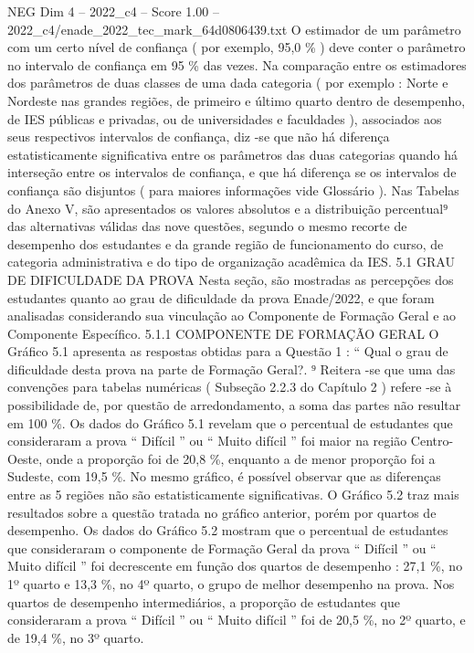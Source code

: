 \begin{textsample}{NEG Dim 4 – 2022\_c4 – Score 1.00 – 2022\_c4/enade\_2022\_tec\_mark\_64d0806439.txt}
O estimador de um parâmetro com um certo nível de confiança ( por exemplo, 95,0 \% ) deve conter o parâmetro no intervalo de confiança em 95 \% das vezes.
Na comparação entre os estimadores dos parâmetros de duas classes de uma dada categoria ( por exemplo : Norte e Nordeste nas grandes regiões, de primeiro e último quarto dentro de desempenho, de IES públicas e privadas, ou de universidades e faculdades ), associados aos seus respectivos intervalos de confiança, diz -se que não há diferença estatisticamente significativa entre os parâmetros das duas categorias quando há interseção entre os intervalos de confiança, e que há diferença se os intervalos de confiança são disjuntos ( para maiores informações vide Glossário ).
Nas Tabelas do Anexo V, são apresentados os valores absolutos e a distribuição percentual⁹ das alternativas válidas das nove questões, segundo o mesmo recorte de desempenho dos estudantes e da grande região de funcionamento do curso, de categoria administrativa e do tipo de organização acadêmica da IES. 5.1 GRAU DE DIFICULDADE DA PROVA Nesta seção, são mostradas as percepções dos estudantes quanto ao grau de dificuldade da prova Enade/2022, e que foram analisadas considerando sua vinculação ao Componente de Formação Geral e ao Componente Específico. 5.1.1 COMPONENTE DE FORMAÇÃO GERAL O Gráfico 5.1 apresenta as respostas obtidas para a Questão 1 : “ Qual o grau de dificuldade desta prova na parte de Formação Geral?. ⁹ Reitera -se que uma das convenções para tabelas numéricas ( Subseção 2.2.3 do Capítulo 2 ) refere -se à possibilidade de, por questão de arredondamento, a soma das partes não resultar em 100 \%.
Os dados do Gráfico 5.1 revelam que o percentual de estudantes que consideraram a prova “ Difícil ” ou “ Muito difícil ” foi maior na região Centro-Oeste, onde a proporção foi de 20,8 \%, enquanto a de menor proporção foi a Sudeste, com 19,5 \%.
No mesmo gráfico, é possível observar que as diferenças entre as 5 regiões não são estatisticamente significativas.
O Gráfico 5.2 traz mais resultados sobre a questão tratada no gráfico anterior, porém por quartos de desempenho.
Os dados do Gráfico 5.2 mostram que o percentual de estudantes que consideraram o componente de Formação Geral da prova “ Difícil ” ou “ Muito difícil ” foi decrescente em função dos quartos de desempenho : 27,1 \%, no 1º quarto e 13,3 \%, no 4º quarto, o grupo de melhor desempenho na prova.
Nos quartos de desempenho intermediários, a proporção de estudantes que consideraram a prova “ Difícil ” ou “ Muito difícil ” foi de 20,5 \%, no 2º quarto, e de 19,4 \%, no 3º quarto.

\end{textsample}
